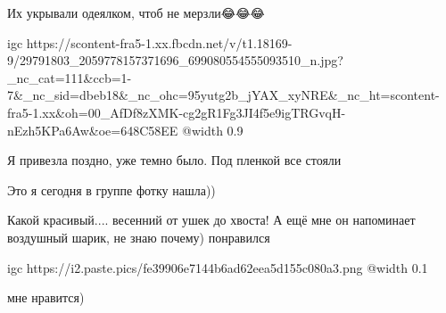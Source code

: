  
 
 
 
 

\qqSecCmt


Их укрывали одеялком, чтоб не мерзли😂😂😂

\ifcmt
  igc https://scontent-fra5-1.xx.fbcdn.net/v/t1.18169-9/29791803_2059778157371696_699080554555093510_n.jpg?_nc_cat=111&ccb=1-7&_nc_sid=dbeb18&_nc_ohc=95yutg2b_jYAX_xyNRE&_nc_ht=scontent-fra5-1.xx&oh=00_AfDf8zXMK-cg2gR1Fg3JI4f5e9igTRGvqH-nEzh5KPa6Aw&oe=648C58EE
  @width 0.9
\fi

\begin{itemize} %

Я привезла поздно, уже темно было. Под пленкой все стояли


Это я сегодня в группе фотку нашла))


Какой красивый.... весенний от ушек до хвоста! А ещё мне он напоминает
воздушный шарик, не знаю почему) понравился

\end{itemize} %


\ifcmt
  igc https://i2.paste.pics/fe39906e7144b6ad62eea5d155c080a3.png
  @width 0.1
\fi


мне нравится)
